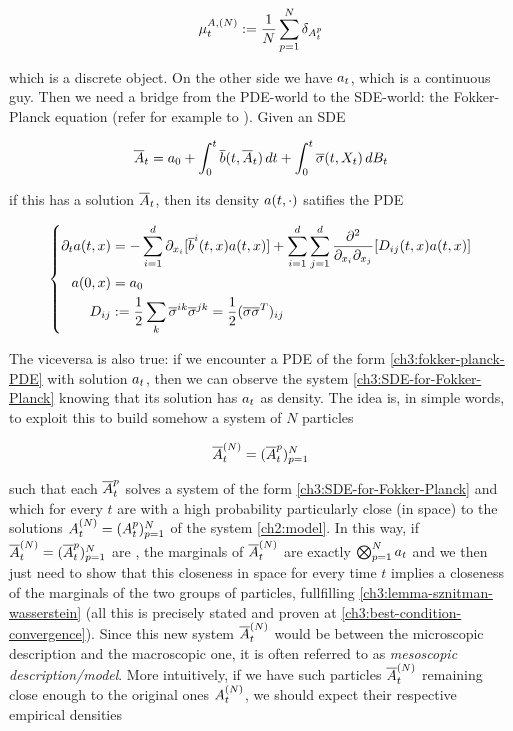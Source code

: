 \begin{equation*}
\mu_t^{A,(N)}:= \frac{1}{N}\sum_{p=1}^N \delta_{A_t^p}
\end{equation*}

which is a discrete object.
On the other side we have $a_t$, which is a continuous guy.
Then we need a bridge from the PDE-world to the SDE-world: the Fokker-Planck equation (refer for example to \autocite[Theorem 8.1.1]{oksendal}).
Given an SDE

\begin{equation}\label{ch3:SDE-for-Fokker-Planck}
	\overline{A}_t = a_0 + \int_0^t \overline{b}(t, \overline{A}_t) \,dt + \int_0^t \overline{\sigma}(t, X_t) \,d B_t
\end{equation}

if this has a solution $\overline{A}_t$, then its density $a(t, \cdot)$ satifies the PDE

\begin{equation*}\label{ch3:fokker-planck-PDE}
	\left\{
		\begin{aligned}
			\partial_t a(t,x) 
			&=  - \sum_{i=1}^{d} \partial_{x_i}[ \overline{b}^i(t,x) a(t,x)] 
			+ \sum_{i=1}^{d} \sum_{j=1}^{d} \frac{\partial^2}{\partial_{x_i}\partial_{x_j}} [D_{ij}(t,x) a(t,x)]
			\\
			a(0,x) &= a_0
			\\
			D_{ij}
			&:= \frac{1}{2} \sum_{k} \overline{\sigma}^{ik}\overline{\sigma}^{jk} = \frac{1}{2} (\overline{\sigma} \overline{\sigma}^T)_{ij}
		\end{aligned}
	\right.
\end{equation*}

The viceversa is also true: if we encounter a PDE of the form \ref{ch3:fokker-planck-PDE} with solution $a_t$, then we can observe the system \ref{ch3:SDE-for-Fokker-Planck} knowing that its solution has $a_t$ as density. 
The idea is, in simple words, to exploit this to build somehow a system of \iid $N$ particles 

\begin{equation}
	\overline{A}_t^{(N)}=(\overline{A}_t^p)_{p=1}^N
\end{equation}

such that each $\overline{A}_t^p$ solves a system of the form \ref{ch3:SDE-for-Fokker-Planck} and which for every $t$ are with a high probability particularly close (in space) to the solutions $A_t^{(N)}=(A_t^p)_{p=1}^N$ of the system \ref{ch2:model}.
In this way, if $\overline{A}_t^{(N)}=(\overline{A}_t^p)_{p=1}^N$ are \iid, the marginals of $\overline{A}_t^{(N)}$ are exactly $\bigotimes_{p=1}^{N}a_t$ and we then just need to show that this closeness in space for every time $t$ implies a closeness of the marginals of the two groups of particles, fullfilling \ref{ch3:lemma-sznitman-wasserstein} (all this is precisely stated and proven at \ref{ch3:best-condition-convergence}).
Since this new system $\overline{A}_t^{(N)}$ would be between the microscopic description and the macroscopic one, it is often referred to as \emph{mesoscopic description/model}.
More intuitively, if we have such particles $\overline{A}_t^{(N)}$ remaining close enough to the original ones $A_t^{(N)}$, we should expect their respective empirical densities 


